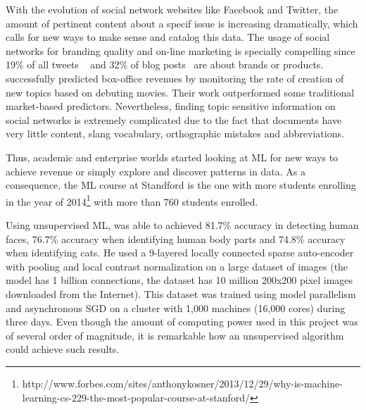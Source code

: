 With the evolution of social network websites like Facebook and Twitter, the amount of pertinent content about a specif issue is increasing dramatically, which calls for new ways to make sense and catalog this data.
The usage of social networks for branding quality and on-line marketing is specially compelling since 19\% of all tweets ~\cite{Jansen2009} and 32\% of blog posts~\cite{Melville2009} are about brands or products. \citet{Asur2010} successfully predicted box-office revenues by monitoring the rate of creation of new topics based on debuting movies. Their work outperformed some traditional market-based predictors. Nevertheless, finding topic sensitive information on social networks is extremely complicated due to the fact that documents have very little content, slang vocabulary, orthographic mistakes and abbreviations. 

Thus, academic and enterprise worlds started looking at \ac{ML} for new ways to achieve revenue or simply explore and discover patterns in data. 
As a consequence, the \ac{ML} course at Standford is the one with more students enrolling in the year of 2014\footnote{http://www.forbes.com/sites/anthonykosner/2013/12/29/why-is-machine-learning-cs-229-the-most-popular-course-at-stanford/} with more than 760 students enrolled.

Using unsupervised \ac{ML}, \citet{Le2011} was able to achieved 81.7\% accuracy in detecting human faces, 76.7\% accuracy when identifying human body parts and 74.8\% accuracy when identifying cats. He used a 9-layered locally connected sparse auto-encoder with pooling and local contrast normalization on a large dataset of images (the model has 1 billion connections, the dataset has 10 million 200x200 pixel images downloaded from the Internet). This dataset was trained using model parallelism and asynchronous SGD on a cluster with 1,000 machines (16,000 cores) during three days. Even though the amount of computing power used in this project was of several order of magnitude, it is remarkable how an unsupervised algorithm could achieve such results.

